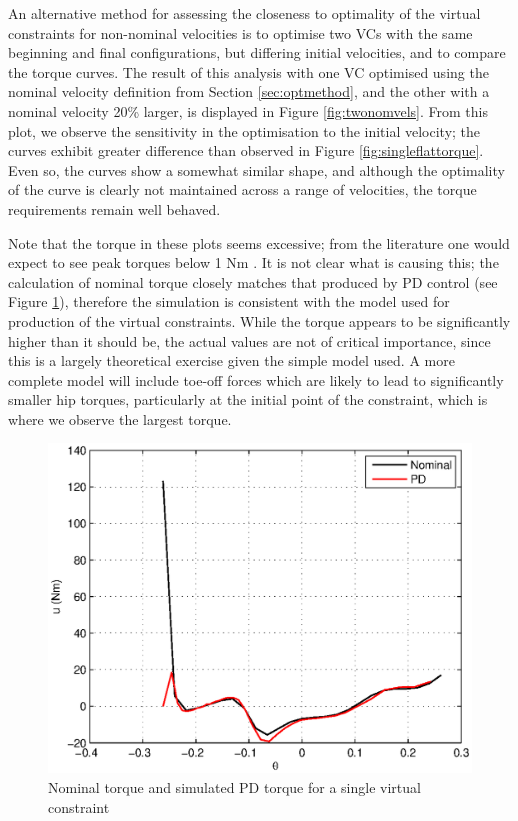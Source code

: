 An alternative method for assessing the closeness to optimality of the virtual constraints for non-nominal velocities is to optimise two VCs with the same beginning and final configurations, but differing initial velocities, and to compare the torque curves. The result of this analysis with one VC optimised using the nominal velocity definition from Section \ref{sec:optmethod}, and the other with a nominal velocity 20\% larger, is displayed in Figure \ref{fig:twonomvels}. From this plot, we observe the sensitivity in the optimisation to the initial velocity; the curves exhibit greater difference than observed in Figure \ref{fig:singleflattorque}. Even so, the curves show a somewhat similar shape, and although the optimality of the curve is clearly not maintained across a range of velocities, the torque requirements remain well behaved.

Note that the torque in these plots seems excessive; from the literature one would expect to see peak torques below 1 Nm \cite{westervelt2007feedback, collins2005efficient}. It is not clear what is causing this; the calculation of nominal torque closely matches that produced by PD control (see Figure \ref{fig:pdmatchesnom}), therefore the simulation is consistent with the model used for production of the virtual constraints. While the torque appears to be significantly higher than it should be, the actual values are not of critical importance, since this is a largely theoretical exercise given the simple model used. A more complete model will include toe-off forces which are likely to lead to significantly smaller hip torques, particularly at the initial point of the constraint, which is where we observe the largest torque.

\begin{figure}
\centering
\includegraphics[width=0.6\linewidth]{7Results/pdmatchesnom}
\caption{Nominal torque and simulated PD torque for a single virtual constraint}
\label{fig:pdmatchesnom}
\end{figure}


